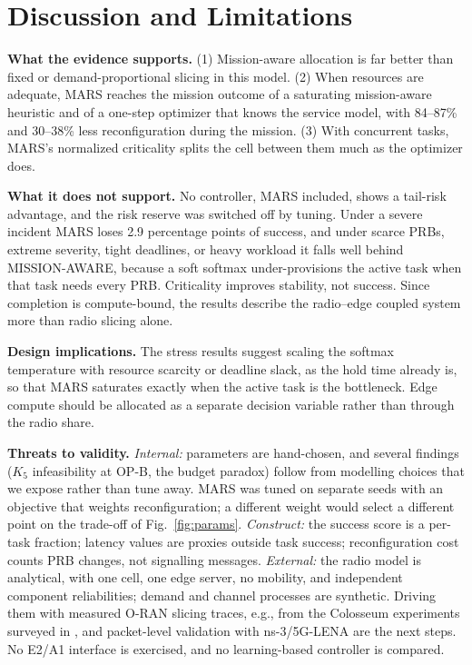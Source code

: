 \documentclass[conference]{IEEEtran}
\newcommand{\figref}[1]{Fig.~\ref{#1}}
\begin{document}
\FloatBarrier
\section{Discussion and Limitations}
\textbf{What the evidence supports.} (1) Mission-aware allocation is far better than fixed or demand-proportional slicing in this model. (2) When resources are adequate, MARS reaches the mission outcome of a saturating mission-aware heuristic and of a one-step optimizer that knows the service model, with 84--87\% and 30--38\% less reconfiguration during the mission. (3) With concurrent tasks, MARS's normalized criticality splits the cell between them much as the optimizer does.

\textbf{What it does not support.} No controller, MARS included, shows a tail-risk advantage, and the risk reserve was switched off by tuning. Under a severe incident MARS loses 2.9 percentage points of success, and under scarce PRBs, extreme severity, tight deadlines, or heavy workload it falls well behind MISSION-AWARE, because a soft softmax under-provisions the active task when that task needs every PRB. Criticality improves stability, not success. Since completion is compute-bound, the results describe the radio--edge coupled system more than radio slicing alone.

\textbf{Design implications.} The stress results suggest scaling the softmax temperature with resource scarcity or deadline slack, as the hold time already is, so that MARS saturates exactly when the active task is the bottleneck. Edge compute should be allocated as a separate decision variable rather than through the radio share.

\textbf{Threats to validity.} \emph{Internal:} parameters are hand-chosen, and several findings ($K_5$ infeasibility at OP-B, the budget paradox) follow from modelling choices that we expose rather than tune away. MARS was tuned on separate seeds with an objective that weights reconfiguration; a different weight would select a different point on the trade-off of \figref{fig:params}. \emph{Construct:} the success score is a per-task fraction; latency values are proxies outside task success; reconfiguration cost counts PRB changes, not signalling messages. \emph{External:} the radio model is analytical, with one cell, one edge server, no mobility, and independent component reliabilities; demand and channel processes are synthetic. Driving them with measured O-RAN slicing traces, e.g., from the Colosseum experiments surveyed in \cite{polese}, and packet-level validation with ns-3/5G-LENA \cite{lena} are the next steps. No E2/A1 interface is exercised, and no learning-based controller is compared.
\end{document}

